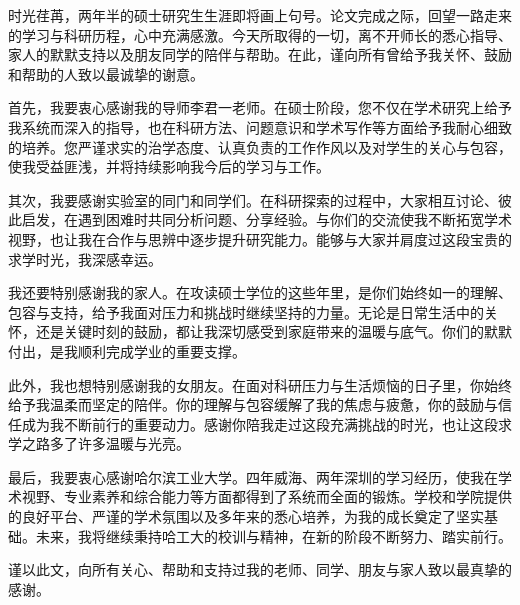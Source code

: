 

\begin{acknowledgements}
时光荏苒，两年半的硕士研究生生涯即将画上句号。论文完成之际，回望一路走来的学习与科研历程，心中充满感激。今天所取得的一切，离不开师长的悉心指导、家人的默默支持以及朋友同学的陪伴与帮助。在此，谨向所有曾给予我关怀、鼓励和帮助的人致以最诚挚的谢意。

首先，我要衷心感谢我的导师李君一老师。在硕士阶段，您不仅在学术研究上给予我系统而深入的指导，也在科研方法、问题意识和学术写作等方面给予我耐心细致的培养。您严谨求实的治学态度、认真负责的工作作风以及对学生的关心与包容，使我受益匪浅，并将持续影响我今后的学习与工作。

其次，我要感谢实验室的同门和同学们。在科研探索的过程中，大家相互讨论、彼此启发，在遇到困难时共同分析问题、分享经验。与你们的交流使我不断拓宽学术视野，也让我在合作与思辨中逐步提升研究能力。能够与大家并肩度过这段宝贵的求学时光，我深感幸运。

我还要特别感谢我的家人。在攻读硕士学位的这些年里，是你们始终如一的理解、包容与支持，给予我面对压力和挑战时继续坚持的力量。无论是日常生活中的关怀，还是关键时刻的鼓励，都让我深切感受到家庭带来的温暖与底气。你们的默默付出，是我顺利完成学业的重要支撑。

此外，我也想特别感谢我的女朋友。在面对科研压力与生活烦恼的日子里，你始终给予我温柔而坚定的陪伴。你的理解与包容缓解了我的焦虑与疲惫，你的鼓励与信任成为我不断前行的重要动力。感谢你陪我走过这段充满挑战的时光，也让这段求学之路多了许多温暖与光亮。

最后，我要衷心感谢哈尔滨工业大学。四年威海、两年深圳的学习经历，使我在学术视野、专业素养和综合能力等方面都得到了系统而全面的锻炼。学校和学院提供的良好平台、严谨的学术氛围以及多年来的悉心培养，为我的成长奠定了坚实基础。未来，我将继续秉持哈工大的校训与精神，在新的阶段不断努力、踏实前行。

谨以此文，向所有关心、帮助和支持过我的老师、同学、朋友与家人致以最真挚的感谢。

\end{acknowledgements}